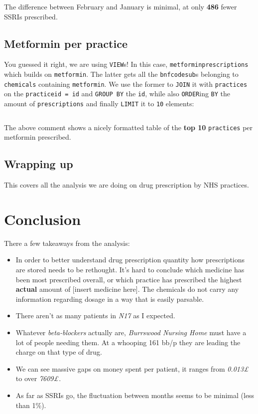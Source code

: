 \documentclass[english,a4paper,]{report}
\begin{document}
\inputminted[firstline=100,lastline=110]{sql}{src/sql/02-queries.sql}

The difference between February and January is minimal, at only
\textbf{486} fewer SSRIs prescribed.

\section{Metformin per practice}\label{metformin-per-practice}

You guessed it right, we are using \texttt{VIEW}s! In this case,
\texttt{metforminprescriptions} which builds on \texttt{metformin}. The
latter gets all the \texttt{bnfcodesub}s belonging to \texttt{chemicals}
containing \texttt{metformin}. We use the former to \texttt{JOIN} it
with \texttt{practices} on the \texttt{practiceid\ =\ id} and
\texttt{GROUP\ BY} the \texttt{id}, while also \texttt{ORDER}ing
\texttt{BY} the amount of \texttt{prescriptions} and finally
\texttt{LIMIT} it to \texttt{10} elements:

\inputminted[firstline=115]{sql}{src/sql/02-queries.sql}

The above comment shows a nicely formatted table of the \textbf{top 10}
\texttt{practices} per metformin prescribed.

\section{Wrapping up}\label{wrapping-up-2}

This covers all the analysis we are doing on drug prescription by NHS
practices.

\chapter{Conclusion}\label{conclusion}

There a few takeaways from the analysis:

\begin{itemize}
\item
  In order to better understand drug prescription quantity how
  prescriptions are stored needs to be rethought. It's hard to conclude
  which medicine has been most prescribed overall, or which practice has
  prescribed the highest \textbf{actual} amount of {[}insert medicine
  here{]}. The chemicals do not carry any information regarding dosage
  in a way that is easily parsable.
\item
  There aren't as many patients in \emph{N17} as I expected.
\item
  Whatever \emph{beta-blockers} actually are, \emph{Burrswood Nursing
  Home} must have a lot of people needing them. At a whooping 161 bb/p
  they are leading the charge on that type of drug.
\item
  We can see massive gaps on money spent per patient, it ranges from
  \emph{0.013£} to over \emph{7609£}.
\item
  As far as SSRIs go, the fluctuation between months seems to be minimal
  (less than 1\%).
\end{itemize}
\end{document}
